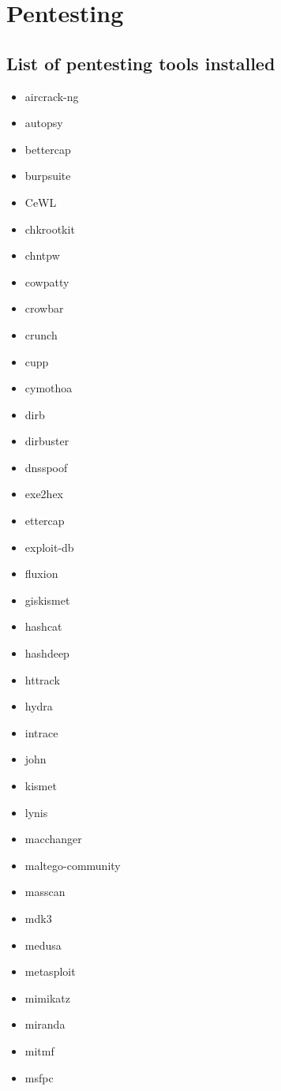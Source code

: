 \documentclass{article}
\begin{document}
\pagebreak

\section{Pentesting}
\subsection{List of pentesting tools installed}

\iffalse
\begin{itemize}
	\item aircrack-ng
	\item autopsy
	\item bettercap
	\item burpsuite
	\item CeWL
	\item chkrootkit
	\item chntpw
	\item cowpatty
	\item crowbar
	\item crunch
	\item cupp
	\item cymothoa
	\item dirb
	\item dirbuster
	\item dnsspoof
	\item exe2hex
	\item ettercap
	\item exploit-db
	\item fluxion
	\item giskismet
	\item hashcat
	\item hashdeep
	\item httrack
	\item hydra
	\item intrace
	\item john
	\item kismet
	\item lynis
	\item macchanger
	\item maltego-community
	\item masscan
	\item mdk3
	\item medusa
	\item metasploit
	\item mimikatz
	\item miranda
	\item mitmf
	\item msfpc

\end{itemize}
\end{document}
